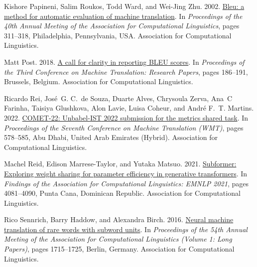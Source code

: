 \documentclass[11pt]{article}
\begin{document}
\begin{thebibliography}{49}
Kishore Papineni, Salim Roukos, Todd Ward, and Wei-Jing Zhu. 2002.
\newblock \href {https://doi.org/10.3115/1073083.1073135} {{B}leu: a method for automatic evaluation of machine translation}.
\newblock In \emph{Proceedings of the 40th Annual Meeting of the Association for Computational Linguistics}, pages 311--318, Philadelphia, Pennsylvania, USA. Association for Computational Linguistics.

Matt Post. 2018.
\newblock \href {https://doi.org/10.18653/v1/W18-6319} {A call for clarity in reporting {BLEU} scores}.
\newblock In \emph{Proceedings of the Third Conference on Machine Translation: Research Papers}, pages 186--191, Brussels, Belgium. Association for Computational Linguistics.

Ricardo Rei, Jos{\'e}~G. C.~de Souza, Duarte Alves, Chrysoula Zerva, Ana~C Farinha, Taisiya Glushkova, Alon Lavie, Luisa Coheur, and Andr{\'e} F.~T. Martins. 2022.
\newblock \href {https://aclanthology.org/2022.wmt-1.52} {{COMET}-22: Unbabel-{IST} 2022 submission for the metrics shared task}.
\newblock In \emph{Proceedings of the Seventh Conference on Machine Translation (WMT)}, pages 578--585, Abu Dhabi, United Arab Emirates (Hybrid). Association for Computational Linguistics.

Machel Reid, Edison Marrese-Taylor, and Yutaka Matsuo. 2021.
\newblock \href {https://doi.org/10.18653/v1/2021.findings-emnlp.344} {Subformer: Exploring weight sharing for parameter efficiency in generative transformers}.
\newblock In \emph{Findings of the Association for Computational Linguistics: EMNLP 2021}, pages 4081--4090, Punta Cana, Dominican Republic. Association for Computational Linguistics.

Rico Sennrich, Barry Haddow, and Alexandra Birch. 2016.
\newblock \href {https://doi.org/10.18653/v1/P16-1162} {Neural machine translation of rare words with subword units}.
\newblock In \emph{Proceedings of the 54th Annual Meeting of the Association for Computational Linguistics (Volume 1: Long Papers)}, pages 1715--1725, Berlin, Germany. Association for Computational Linguistics.


\end{thebibliography}
\end{document}
